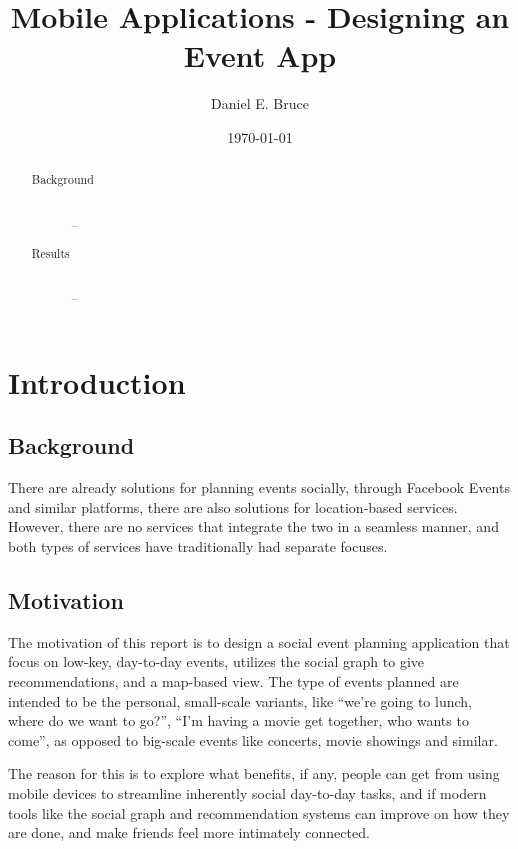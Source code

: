 \documentclass[]{report}
\begin{document}
\title{Mobile Applications - Designing an Event App}
\author{Daniel E. Bruce}
\date{\today}
\maketitle

\begin{abstract}
  \begin{description}
    \item[Background] \hfill \\
      --
    \item[Results] \hfill \\
      --
  \end{description}
\end{abstract}

\tableofcontents

\chapter{Introduction}

\section{Background}

There are already solutions for planning events socially, through Facebook
Events and similar platforms, there are also solutions for location-based
services. However, there are no services that integrate the two in a seamless
manner, and both types of services have traditionally had separate focuses.

\section{Motivation}

The motivation of this report is to design a social event planning application
that focus on low-key, day-to-day events, utilizes the social graph to give
recommendations, and a map-based view. The type of events planned are intended
to be the personal, small-scale variants, like ``we're going to lunch, where do
we want to go?'', ``I'm having a movie get together, who wants to come'', as
opposed to big-scale events like concerts, movie showings and similar.

The reason for this is to explore what benefits, if any, people can get from
using mobile devices to streamline inherently social day-to-day tasks, and if
modern tools like the social graph and recommendation systems can improve on how
they are done, and make friends feel more intimately connected.
\end{document}
